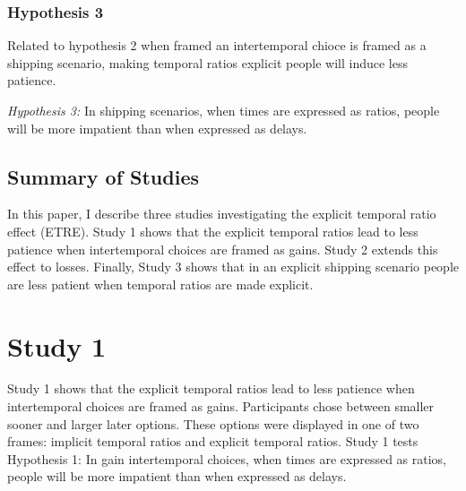 \documentclass[]{article}
\begin{document}
\subsubsection{Hypothesis 3}
Related to hypothesis 2 when framed an intertemporal chioce is framed as a shipping scenario,  making temporal ratios explicit people will induce less patience. 

\textit{Hypothesis 3:} In shipping scenarios, when times are expressed as ratios, people will be more impatient than when expressed as delays. 


\subsection{Summary of Studies}

In this paper, I describe three studies investigating the explicit temporal ratio effect (ETRE).
Study 1 shows that the explicit temporal ratios lead to less patience when intertemporal choices are framed as gains.
Study 2 extends this effect to losses.
Finally, Study 3 shows that in an explicit shipping scenario people are less patient when temporal ratios are made explicit. 


%
%



\section{Study 1}
Study 1 shows that the explicit temporal ratios lead to less patience when intertemporal choices are framed as gains.
Participants chose between smaller sooner and larger later options. 
These options were displayed in one of two frames: implicit temporal ratios and explicit temporal ratios. 
Study 1 tests Hypothesis 1: In gain intertemporal choices, when times are expressed as ratios, people will be more impatient than when expressed as delays. 
\end{document}
